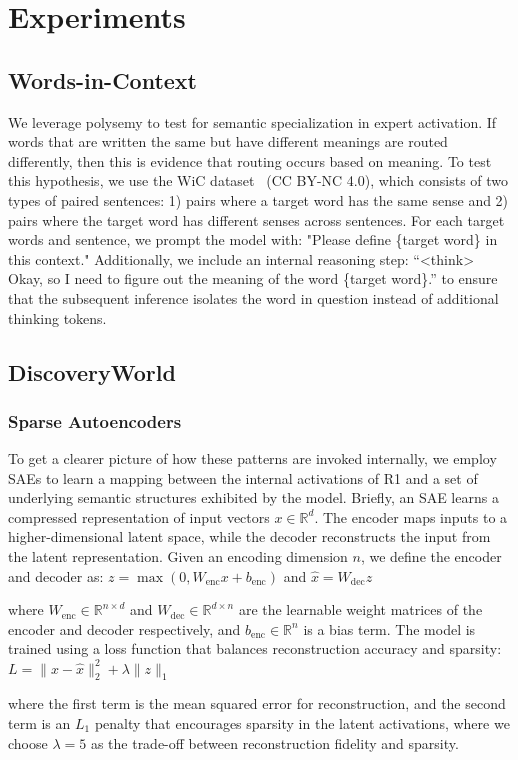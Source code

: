 \section{Experiments} %

\subsection{Words-in-Context} 

We leverage polysemy to test for semantic specialization in expert activation. If words that are written the same but have different meanings are routed differently, then this is evidence that routing occurs based on meaning. To test this hypothesis, we use the WiC dataset~\cite{pilehvar2018wic} (CC BY-NC 4.0), which consists of two types of paired sentences: 1) pairs where a target word has the same sense and 2) pairs where the target word has different senses across sentences.
For each target words and sentence, we prompt the model with:
"Please define \{target word\} in this context."
Additionally, we include an internal reasoning step:
``<think> Okay, so I need to figure out the meaning of the word \{target word\}.'' to ensure that the subsequent inference isolates the word in question instead of additional thinking tokens.

\subsection{DiscoveryWorld}


\subsubsection*{Sparse Autoencoders}

To get a clearer picture of how these patterns are invoked internally, we 
employ SAEs to learn a mapping between the internal activations of R1 and a set of underlying semantic structures exhibited by the model. 
Briefly, an SAE learns a compressed representation of input vectors $x \in \mathbb{R}^d$. The encoder maps inputs to a higher-dimensional latent space, while the decoder reconstructs the input from the latent representation. Given an encoding dimension $n$, we define the encoder and decoder as:  
$
z = \max(0, W_{\text{enc}} x + b_{\text{enc}})
$
 and
$
\hat{x} = W_{\text{dec}} z
$

where $W_{\text{enc}} \in \mathbb{R}^{n \times d}$ and $W_{\text{dec}} \in \mathbb{R}^{d \times n}$ are the learnable weight matrices of the encoder and decoder respectively, and $b_{\text{enc}} \in \mathbb{R}^{n}$ is a bias term.  
The model is trained using a loss function that balances reconstruction accuracy and sparsity:  
$L = \| x - \hat{x} \|_2^2 + \lambda \| z \|_1$


where the first term is the mean squared error for reconstruction, and the second term is an $L_1$ penalty that encourages sparsity in the latent activations, where we choose $\lambda = 5$ as the trade-off between reconstruction fidelity and sparsity.  











